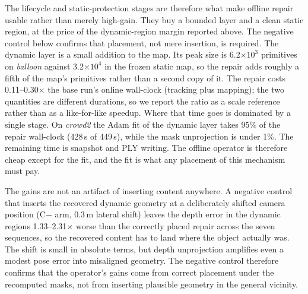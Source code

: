 \documentclass[10pt,twocolumn,letterpaper]{article}
\newcommand{\gate}[1]{{#1}} %
\begin{document}
The lifecycle and static-protection stages are therefore what make offline repair usable rather than
merely high-gain. They buy a bounded layer and a clean static region, at the price of the
dynamic-region margin reported above. The negative
control below confirms that placement, not mere insertion, is required.
 The dynamic layer is a small addition to the map. Its peak size is
\gate{6.2$\times 10^3$} primitives on \emph{balloon} against \gate{3.2$\times 10^4$} in
the frozen static map, so the repair adds roughly a fifth of the map's primitives
rather than a second copy of it. %
 The repair costs \gate{0.11--0.30$\times$} the base run's online wall-clock (tracking
plus mapping); the two quantities are different durations, so we report the ratio as a
scale reference rather than as a like-for-like speedup. %
Where that time goes is dominated by a single stage. On \emph{crowd2} the Adam fit
of the dynamic layer takes \gate{95\%} of the repair wall-clock
(\gate{428}\,s of \gate{449}\,s), while the mask unprojection is under \gate{1\%}. %
The remaining time is snapshot and PLY writing. The offline operator is therefore
cheap except for the fit, and the fit is what any placement of this mechanism must
pay.



The gains are not an artifact of inserting content anywhere. A negative control that
inserts the recovered dynamic geometry at a deliberately shifted camera position
(C$-$ arm, \gate{0.3}\,m lateral shift) leaves the depth error in the dynamic regions
\gate{1.33--2.31$\times$} worse than the correctly placed repair across the seven
sequences, %
so the recovered content has to land where the object actually was. The shift is
small in absolute terms, but depth unprojection amplifies even a modest pose error
into misaligned geometry. The negative control therefore confirms that the
operator's gains come from correct placement under the recomputed masks, not from
inserting plausible geometry in the general vicinity.
\end{document}

